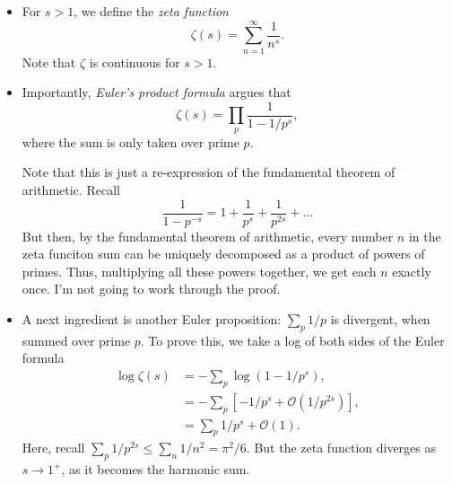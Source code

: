 \documentclass[11pt,
        usenames, %
        dvipsnames %
    ]{report}
\newcommand*{\p}[1]{\left(#1\right)}
\newcommand*{\s}[1]{\left[#1\right]}
\begin{document}
\begin{itemize}
\begin{itemize}
            \item For $s > 1$, we define the \emph{zeta function}
                \begin{equation}
                    \zeta(s) = \sum\limits_{n = 1}^\infty \frac{1}{n^s}.
                \end{equation}
                Note that $\zeta$ is continuous for $s > 1$.

            \item Importantly, \emph{Euler's product formula} argues that
                \begin{equation}
                    \zeta(s) = \prod_p \frac{1}{1 - 1/p^s},
                \end{equation}
                where the sum is only taken over prime $p$.

                Note that this is just a re-expression of the fundamental
                theorem of arithmetic. Recall
                \begin{equation}
                    \frac{1}{1 - p^{-s}}
                        = 1 + \frac{1}{p^s} + \frac{1}{p^{2s}} + \dots
                \end{equation}
                But then, by the fundamental theorem of arithmetic, every number
                $n$ in the zeta funciton sum can be uniquely decomposed as a
                product of powers of primes. Thus, multiplying all these
                powers together, we get each $n$ exactly once. I'm not going to
                work through the proof.

            \item A next ingredient is another Euler proposition: $\sum\limits_p
                1/p$ is divergent, when summed over prime $p$. To prove this, we
                take a log of both sides of the Euler formula
                \begin{align}
                    \log \zeta(s) &= -\sum\limits_p \log\p{1 - 1/p^s},\\
                        &= -\sum\limits_p \s{-1/p^s + \mathcal{O}(1/p^{2s})},\\
                        &= \sum\limits_p 1/p^s + \mathcal{O}(1).
                \end{align}
                Here, recall $\sum\limits_p 1/p^{2s} \leq \sum\limits_n 1/n^2 =
                \pi^2/6$. But the zeta function diverges as $s \to 1^+$, as it
                becomes the harmonic sum.
        \end{itemize}


\end{itemize}
\end{document}
